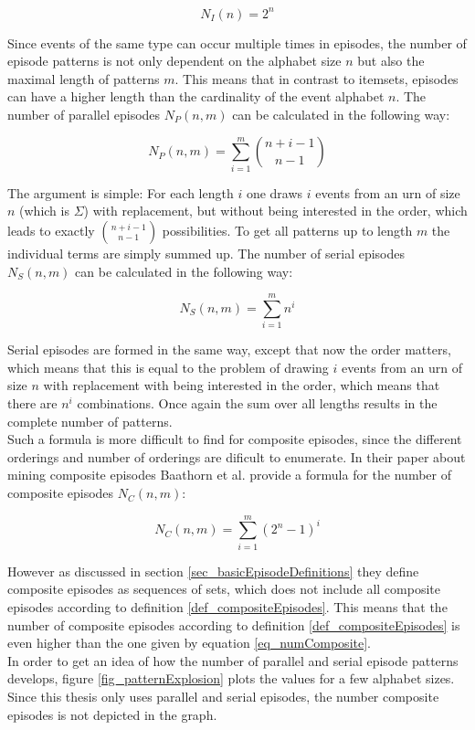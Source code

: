 \begin{equation}
	N_I(n) = 2^n
\end{equation}

Since events of the same type can occur multiple times in episodes, the number of episode patterns is not only dependent on the alphabet size $n$ but also the maximal length of patterns $m$. This means that in contrast to itemsets, episodes can have a higher length than the cardinality of the event alphabet $n$. The number of parallel episodes $N_P(n,m)$ can be calculated in the following way:

\begin{equation}
	N_P(n,m) = \sum_{i=1}^m {{n+i-1}\choose{n-1}}
\end{equation}

The argument is simple: For each length $i$ one draws $i$ events from an urn of size $n$ (which is $\Sigma$) with replacement, but without being interested in the order, which leads to exactly ${n+i-1}\choose{n-1}$ possibilities. To get all patterns up to length $m$ the individual terms are simply summed up. The number of serial episodes $N_S(n,m)$ can be calculated in the following way:

\begin{equation}
	N_S(n,m) = \sum_{i=1}^m n^i
\end{equation}

Serial episodes are formed in the same way, except that now the order matters, which means that this is equal to the problem of drawing $i$ events from an urn of size $n$ with replacement with being interested in the order, which means that there are $n^i$ combinations. Once again the sum over all lengths results in the complete number of patterns. \\
Such a formula is more difficult to find for composite episodes, since the different orderings and number of orderings are dificult to enumerate. In their paper about mining composite episodes Baathorn et al. \cite{bathoorn2007finding} provide a formula for the number of composite episodes $N_C(n,m)$:

\begin{equation}
\label{eq_numComposite}
	N_C(n,m) = \sum_{i=1}^m (2^n -1)^i
\end{equation}

However as discussed in section \ref{sec_basicEpisodeDefinitions} they define composite episodes as sequences of sets, which does not include all composite episodes according to definition \ref{def_compositeEpisodes}. This means that the number of composite episodes according to definition \ref{def_compositeEpisodes} is even higher than the one given by equation \ref{eq_numComposite}. \\
In order to get an idea of how the number of parallel and serial episode patterns develops, figure \ref{fig_patternExplosion} plots the values for a few alphabet sizes. Since this thesis only uses parallel and serial episodes, the number composite episodes is not depicted in the graph.

